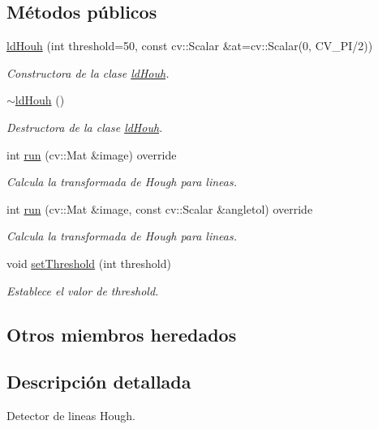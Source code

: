 \subsection*{Métodos públicos}
\begin{DoxyCompactItemize}
\item 
\hyperlink{class_i3_d_1_1ld_houh_ad9387cc250dc409bd8ab5e0768f0e8fb}{ld\+Houh} (int threshold=50, const cv\+::\+Scalar \&at=cv\+::\+Scalar(0, C\+V\+\_\+\+PI/2))
\begin{DoxyCompactList}\small\item\em Constructora de la clase \hyperlink{class_i3_d_1_1ld_houh}{ld\+Houh}. \end{DoxyCompactList}\item 
\hyperlink{class_i3_d_1_1ld_houh_a2f0c3dd6be7e15fc7fcafdbbf0520cf8}{$\sim$ld\+Houh} ()
\begin{DoxyCompactList}\small\item\em Destructora de la clase \hyperlink{class_i3_d_1_1ld_houh}{ld\+Houh}. \end{DoxyCompactList}\item 
int \hyperlink{class_i3_d_1_1ld_houh_a17c6836029eeb9448e6bd661c1aac16c}{run} (cv\+::\+Mat \&image) override
\begin{DoxyCompactList}\small\item\em Calcula la transformada de Hough para lineas. \end{DoxyCompactList}\item 
int \hyperlink{class_i3_d_1_1ld_houh_a548494c74a114c679ddc050dc9fd991a}{run} (cv\+::\+Mat \&image, const cv\+::\+Scalar \&angletol) override
\begin{DoxyCompactList}\small\item\em Calcula la transformada de Hough para lineas. \end{DoxyCompactList}\item 
void \hyperlink{class_i3_d_1_1ld_houh_ae7652d43e53ac59b4bdbca7fd2de3bdb}{set\+Threshold} (int threshold)
\begin{DoxyCompactList}\small\item\em Establece el valor de threshold. \end{DoxyCompactList}\end{DoxyCompactItemize}
\subsection*{Otros miembros heredados}


\subsection{Descripción detallada}
Detector de lineas Hough. 

